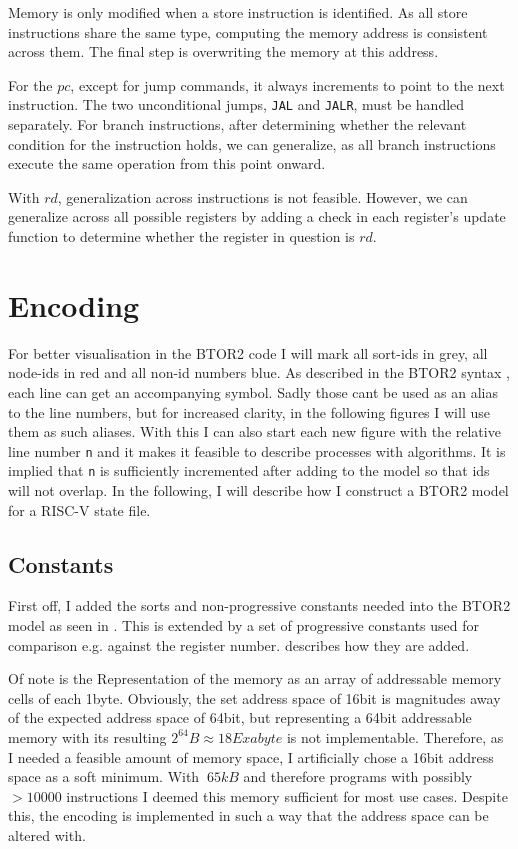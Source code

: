 Memory is only modified when a store instruction is identified. As all store
instructions share the same type, computing the memory address is consistent
across them. The final step is overwriting the memory at this address.

For the $pc$, except for jump commands, it always increments to point to the
next instruction. The two unconditional jumps, \texttt{JAL} and \texttt{JALR},
must be handled separately. For branch instructions, after determining whether
the relevant condition for the instruction holds, we can generalize, as all
branch instructions execute the same operation from this point onward.

With $rd$, generalization across instructions is not feasible. However, we can
generalize across all possible registers by adding a check in each register's
update function to determine whether the register in question is $rd$.

\section{Encoding}
For better visualisation in the BTOR2 code I will mark all sort-ids in
\textcolor{UniGrey}{grey}, all node-ids in \textcolor{UniRed}{red} and all
non-id numbers \textcolor{UniBlue}{blue}. As described in the BTOR2 syntax
\cite[Figure 1]{btor2}, each line can get an accompanying symbol. Sadly those
cant be used as an alias to the line numbers, but for increased clarity, in the
following figures I will use them as such aliases. With this I can also start
each new figure with the relative line number \texttt{n} and it makes it
feasible to describe processes with algorithms. It is implied that \texttt{n}
is sufficiently incremented after adding to the model so that ids will not
overlap. In the following, I will describe how I construct a BTOR2 model for a
RISC-V state file.

\subsection{Constants}
First off, I added the sorts and non-progressive constants needed into the
BTOR2 model as seen in . This is extended by a set of
progressive constants used for comparison e.g. against the register number.
 describes how they are added.

Of note is the Representation of the memory as an array of addressable memory
cells of each 1byte. Obviously, the set address space of 16bit is magnitudes
away of the expected address space of 64bit, but representing a 64bit
addressable memory with its resulting $2^{64}B \approx 18 Exabyte$ is not
implementable. Therefore, as I needed a feasible amount of memory space, I
artificially chose a 16bit address space as a soft minimum. With $~65kB$ and
therefore programs with possibly $>10000$ instructions I deemed this memory
sufficient for most use cases. Despite this, the encoding is implemented in
such a way that the address space can be altered with. 

